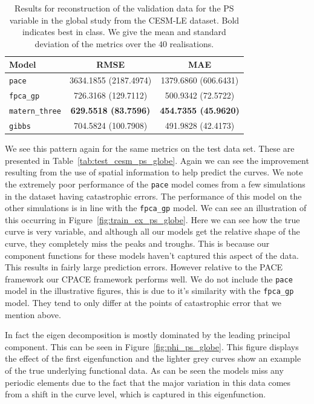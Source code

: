 \begin{table}
	\caption[Results for the PS variable on validation data in the Global study.]{Results for reconstruction of the validation data for the PS variable in the global study from the CESM-LE dataset. Bold indicates best in class. We give the mean  and standard deviation of the metrics over the $40$  realisations.}
	\centering
	\label{tab:train_cesm_ps_globe}
	\begin{tabular}{lcc}
		\toprule
		\textbf{Model} & \textbf{RMSE} & \textbf{MAE} \\
		\midrule
		\verb*|pace| & 3634.1855 (2187.4974) & 1379.6860 (606.6431) \\
		\verb*|fpca_gp| & 726.3168 (129.7112)& 500.9342	(72.5722)\\
		\verb*|matern_three| & \textbf{629.5518	(83.7596)}& \textbf{454.7355	(45.9620)}\\
		\verb*|gibbs| & 704.5824 (100.7908) & 491.9828 (42.4173)\\
		\bottomrule
	\end{tabular}
\end{table}

We see this pattern again for the same metrics on the test data set.
These are presented in Table~\ref{tab:test_cesm_ps_globe}.
Again we can see the improvement resulting from the use of spatial information to help predict the curves.
We note the extremely poor performance of the \verb*|pace| model comes from a few simulations in the dataset having catastrophic errors.
The performance of this model on the other simulations is in line with the \verb*|fpca_gp| model.
We can see an illustration of this occurring in Figure~\ref{fig:train_ex_ps_globe}.
Here we can see how the true curve is very variable, and although all our models get the relative shape of the curve, they completely miss the peaks and troughs.
This is because our component functions for these models haven't captured this aspect of the data.
This results in fairly large prediction errors.
However relative to the PACE framework our CPACE framework performs well.
We do not include the \verb*|pace| model in the illustrative figures, this is due to it's similarity with the \verb*|fpca_gp| model.
They tend to only differ at the points of catastrophic error that we mention above.

In fact the eigen decomposition is mostly dominated by the leading principal component.
This can be seen in Figure~\ref{fig:phi_ps_globe}.
This figure displays the effect of the first eigenfunction and the lighter grey curves show an example of the true underlying functional data.
As can be seen the models miss any periodic elements due to the fact that the major variation in this data comes from a shift in the curve level, which is captured in this eigenfunction. 


